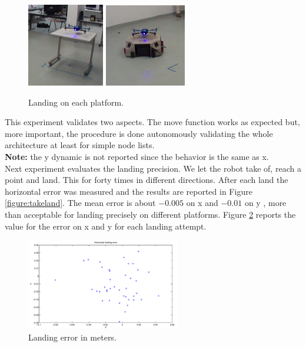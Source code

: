 \begin{figure}[h]
\centering
 \includegraphics[width=0.3\textwidth]{multi1.png}\hspace{0.01\textwidth}
 \includegraphics[width=0.3154\textwidth]{multi2.png}\\[1em]
 \caption{Landing on each platform.}
 \label{figure:mulland}
\end{figure}

This experiment validates two aspects. The move function works as expected but, more important, the procedure is done autonomously validating the whole architecture at least for simple node lists. \\

\noindent
\textbf{Note:} the y dynamic is not reported since the behavior is the same as x. \\

\noindent
Next experiment evaluates the landing precision. We let the robot take of, reach a point and land. This for forty times in different directions. After each land the horizontal error was measured and the results are reported in Figure \ref{figure:takeland}. The mean error is about $-0.005$ on x and $-0.01$ on y , more than acceptable for landing precisely on different platforms. Figure \ref{figure:landerr} reports the value for the error on x and y for each landing attempt.

\begin{figure}[h]
\centering
 \includegraphics[width=0.6\textwidth]{landing.png}
 \caption{Landing error in meters.}
 \label{figure:landerr}
\end{figure}


